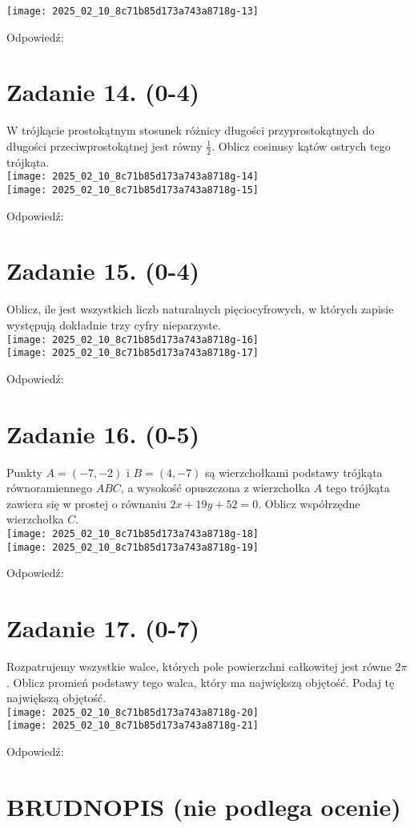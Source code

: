 \documentclass[10pt]{article}
\begin{document}
\begin{center}
\texttt{[image: 2025\_02\_10\_8c71b85d173a743a8718g-13]}
\end{center}

Odpowiedź:

\section*{Zadanie 14. (0-4)}
W trójkącie prostokątnym stosunek różnicy długości przyprostokątnych do długości przeciwprostokątnej jest równy \(\frac{1}{2}\). Oblicz cosinusy kątów ostrych tego trójkąta.\\
\texttt{[image: 2025\_02\_10\_8c71b85d173a743a8718g-14]}\\
\texttt{[image: 2025\_02\_10\_8c71b85d173a743a8718g-15]}

Odpowiedź:

\section*{Zadanie 15. (0-4)}
Oblicz, ile jest wszystkich liczb naturalnych pięciocyfrowych, w których zapisie występują dokładnie trzy cyfry nieparzyste.\\
\texttt{[image: 2025\_02\_10\_8c71b85d173a743a8718g-16]}\\
\texttt{[image: 2025\_02\_10\_8c71b85d173a743a8718g-17]}

Odpowiedź:

\section*{Zadanie 16. (0-5)}
Punkty \(A=(-7,-2)\) i \(B=(4,-7)\) są wierzchołkami podstawy trójkąta równoramiennego \(A B C\), a wysokość opuszczona z wierzchołka \(A\) tego trójkąta zawiera się w prostej o równaniu \(2 x+19 y+52=0\). Oblicz współrzędne wierzchołka \(C\).\\
\texttt{[image: 2025\_02\_10\_8c71b85d173a743a8718g-18]}\\
\texttt{[image: 2025\_02\_10\_8c71b85d173a743a8718g-19]}

Odpowiedź:

\section*{Zadanie 17. (0-7)}
Rozpatrujemy wszystkie walce, których pole powierzchni całkowitej jest równe \(2 \pi\). Oblicz promień podstawy tego walca, który ma największą objętość. Podaj tę największą objętość.\\
\texttt{[image: 2025\_02\_10\_8c71b85d173a743a8718g-20]}\\
\texttt{[image: 2025\_02\_10\_8c71b85d173a743a8718g-21]}

Odpowiedź:

\section*{BRUDNOPIS (nie podlega ocenie)}
\end{document}
